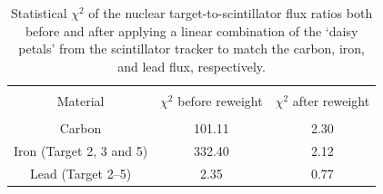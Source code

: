 \begin{table}[t!]
    \vspace{5pt}
    \centering
    \begin{tabularx}{0.72\textwidth}{c c c}
    \hline \\ [-1.5 ex]
    Material & $\chi^2$ before reweight & $\chi^2$ after reweight\\ [0.5ex] %
    \hline
    \hline \\ [-2.0ex]
    Carbon & 101.11 & 2.30 \\
    Iron (Target 2, 3 and 5) & 332.40 & 2.12 \\
    Lead (Target 2--5) & 2.35 & 0.77 \\
    \hline
    \end{tabularx}
    \caption{Statistical $\chi^2$ of the nuclear target-to-scintillator flux ratios both before and after applying a linear combination of the ‘daisy petals' from the scintillator tracker to match the carbon, iron, and lead flux, respectively. }
    \label{table:chi2beforeAndAfterDaisy}
\end{table}
